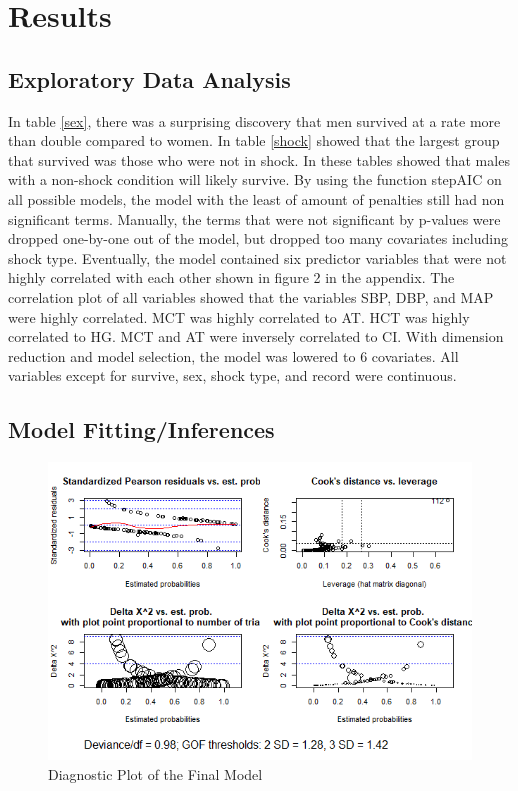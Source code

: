 \documentclass{article}\usepackage[]{graphicx}\usepackage[]{color}
\begin{document}
\section{Results}
\subsection{Exploratory Data Analysis}
\qquad In table \ref{sex}, there was a surprising discovery that men survived at a rate more than double compared to women. In table \ref{shock} showed that the largest group that survived was those who were not in shock. In these tables showed that males with a non-shock condition will likely survive. By using the function stepAIC on all possible models, the model with the least of amount of penalties still had non significant terms. Manually, the terms that were not significant by p-values were dropped one-by-one out of the model, but dropped too many covariates including shock type. Eventually, the model contained six predictor variables that were not highly correlated with each other shown in figure 2 in the appendix. The correlation plot of all variables showed that the variables SBP, DBP, and MAP were highly correlated. MCT was highly correlated to AT. HCT was highly correlated to HG. MCT and AT were inversely correlated to CI. With dimension reduction and model selection, the model was lowered to 6 covariates. All variables except for survive, sex, shock type, and record were continuous.
\subsection{Model Fitting/Inferences}
\qquad 

\begin{figure}
\centering
\label{diagnostics}
\caption{Diagnostic Plot of the Final Model}
\includegraphics{diagnostics.png}
\end{figure}
\end{document}
